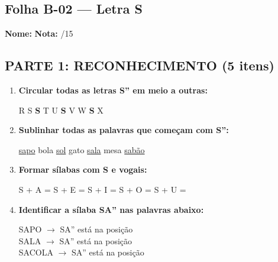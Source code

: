 

\subsection{Folha B-02 --- Letra S}

\begin{exercicio}

\noindent\textbf{Nome:} \underline{\hspace{4cm}} \quad \textbf{Nota:} \underline{\hspace{1cm}}/15

\subsection*{PARTE 1: RECONHECIMENTO (5 itens)}

\begin{enumerate}
  \item \textbf{Circular todas as letras S'' em meio a outras:}
  \begin{center}
  R \quad S \quad \textbf{S} \quad T \quad U \quad \textbf{S} \quad V \quad W \quad \textbf{S} \quad X
  \end{center}

  \item \textbf{Sublinhar todas as palavras que começam com S'':}
  \begin{center}
  \uline{sapo} \quad bola \quad \uline{sol} \quad gato \quad \uline{sala} \quad mesa \quad \uline{sabão}
  \end{center}

  \item \textbf{Formar sílabas com S e vogais:}
  \begin{center}
  S + A = \underline{\hspace{1.5cm}} \quad S + E = \underline{\hspace{1.5cm}} \quad S + I = \underline{\hspace{1.5cm}} \quad S + O = \underline{\hspace{1.5cm}} \quad S + U = \underline{\hspace{1.5cm}}
  \end{center}

  \item \textbf{Identificar a sílaba SA'' nas palavras abaixo:}
  \begin{center}
  SAPO $\rightarrow$ SA'' está na posição \underline{\hspace{1cm}} \\
  SALA $\rightarrow$ SA'' está na posição \underline{\hspace{1cm}} \\
  SACOLA $\rightarrow$ SA'' está na posição \underline{\hspace{1cm}}
  \end{center}


\end{enumerate}
\end{exercicio}
